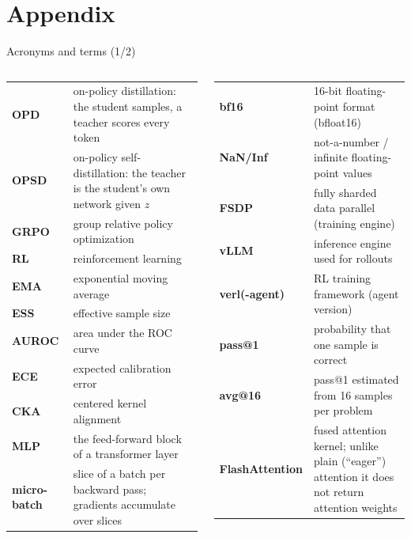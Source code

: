 \documentclass[aspectratio=169,11pt]{beamer}
\begin{document}


\section{Appendix}

\begin{frame}{Acronyms and terms (1/2)}
\scriptsize
\setlength{\tabcolsep}{4pt}\renewcommand{\arraystretch}{1.15}
\begin{columns}[T]
\begin{tabularx}{\linewidth}{@{}>{\bfseries}l Y@{}}
\toprule
OPD & on-policy distillation: the student samples, a teacher scores every token\\
OPSD & on-policy self-distillation: the teacher is the student's own network given $z$\\
GRPO & group relative policy optimization\\
RL & reinforcement learning\\
EMA & exponential moving average\\
ESS & effective sample size\\
AUROC & area under the ROC curve\\
ECE & expected calibration error\\
CKA & centered kernel alignment\\
MLP & the feed-forward block of a transformer layer\\
micro-batch & slice of a batch per backward pass; gradients accumulate over slices\\
\bottomrule
\end{tabularx}
\begin{tabularx}{\linewidth}{@{}>{\bfseries}l Y@{}}
\toprule
bf16 & 16-bit floating-point format (bfloat16)\\
NaN/Inf & not-a-number / infinite floating-point values\\
FSDP & fully sharded data parallel (training engine)\\
vLLM & inference engine used for rollouts\\
verl(-agent) & RL training framework (agent version)\\
pass@1 & probability that one sample is correct\\
avg@16 & pass@1 estimated from 16 samples per problem\\
FlashAttention & fused attention kernel; unlike plain (``eager'') attention it does not return attention weights\\
\bottomrule
\end{tabularx}
\end{columns}
\end{frame}
\end{document}
